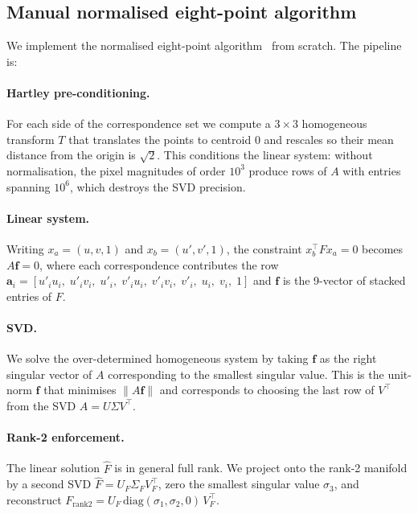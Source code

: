 \documentclass[twocolumn]{article}
\begin{document}
\subsection{Manual normalised eight-point algorithm}
\label{sec:F-8pt}

We implement the normalised eight-point
algorithm~\cite{hartley1997,hartley2003} from scratch. The pipeline
is:

\paragraph{Hartley pre-conditioning.} For each side of the
correspondence set we compute a $3 \times 3$ homogeneous transform
$T$ that translates the points to centroid $0$ and rescales so
their mean distance from the origin is $\sqrt{2}$. This conditions
the linear system: without normalisation, the pixel magnitudes of
order $10^{3}$ produce rows of $A$ with entries spanning $10^{6}$,
which destroys the SVD precision.

\paragraph{Linear system.} Writing $x_a = (u, v, 1)$ and
$x_b = (u', v', 1)$, the constraint $x_b^{\top} F x_a = 0$ becomes
$A \mathbf{f} = 0$, where each correspondence contributes the row
$\mathbf{a}_i = [u'_i u_i,\; u'_i v_i,\; u'_i,\; v'_i u_i,\;
v'_i v_i,\; v'_i,\; u_i,\; v_i,\; 1]$
and $\mathbf{f}$ is the 9-vector of stacked entries of $F$.

\paragraph{SVD.} We solve the over-determined homogeneous system by
taking $\mathbf{f}$ as the right singular vector of $A$ corresponding
to the smallest singular value. This is the unit-norm $\mathbf{f}$
that minimises $\|A\mathbf{f}\|$ and corresponds to choosing the last
row of $V^{\top}$ from the SVD $A = U \Sigma V^{\top}$.

\paragraph{Rank-2 enforcement.} The linear solution $\hat F$ is in
general full rank. We project onto the rank-2 manifold by a second
SVD $\hat F = U_F \Sigma_F V_F^{\top}$, zero the smallest singular
value $\sigma_3$, and reconstruct $F_{\text{rank2}} = U_F\,
\text{diag}(\sigma_1, \sigma_2, 0)\, V_F^{\top}$.
\end{document}
